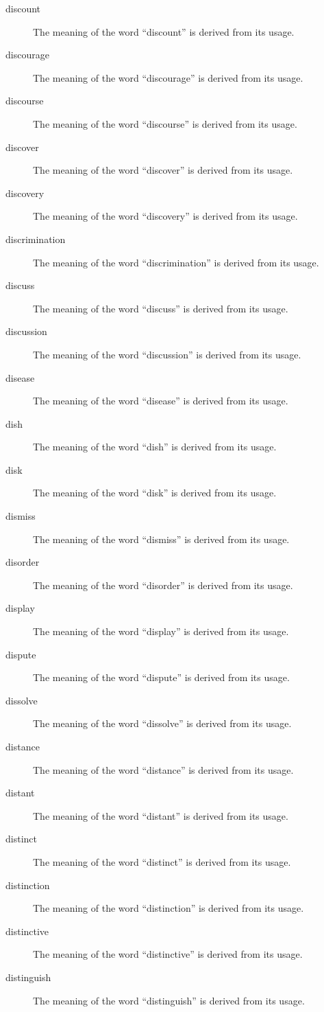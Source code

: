 \documentclass[12pt, letterpaper]{memoir}
\begin{document}
\begin{description}
\item[discount] The meaning of the word ``discount'' is derived from its usage.
\item[discourage] The meaning of the word ``discourage'' is derived from its usage.
\item[discourse] The meaning of the word ``discourse'' is derived from its usage.
\item[discover] The meaning of the word ``discover'' is derived from its usage.
\item[discovery] The meaning of the word ``discovery'' is derived from its usage.
\item[discrimination] The meaning of the word ``discrimination'' is derived from its usage.
\item[discuss] The meaning of the word ``discuss'' is derived from its usage.
\item[discussion] The meaning of the word ``discussion'' is derived from its usage.
\item[disease] The meaning of the word ``disease'' is derived from its usage.
\item[dish] The meaning of the word ``dish'' is derived from its usage.
\item[disk] The meaning of the word ``disk'' is derived from its usage.
\item[dismiss] The meaning of the word ``dismiss'' is derived from its usage.
\item[disorder] The meaning of the word ``disorder'' is derived from its usage.
\item[display] The meaning of the word ``display'' is derived from its usage.
\item[dispute] The meaning of the word ``dispute'' is derived from its usage.
\item[dissolve] The meaning of the word ``dissolve'' is derived from its usage.
\item[distance] The meaning of the word ``distance'' is derived from its usage.
\item[distant] The meaning of the word ``distant'' is derived from its usage.
\item[distinct] The meaning of the word ``distinct'' is derived from its usage.
\item[distinction] The meaning of the word ``distinction'' is derived from its usage.
\item[distinctive] The meaning of the word ``distinctive'' is derived from its usage.
\item[distinguish] The meaning of the word ``distinguish'' is derived from its usage.

\end{description}
\end{document}
